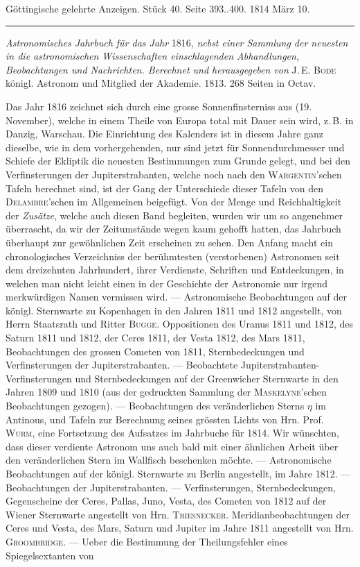 \clearpage
{}
\hypertarget{native-568-lower}{}
\begin{center}\small Göttingische gelehrte Anzeigen. Stück 40. Seite 393..400. 1814 März 10.\\[3pt]\rule{.72\linewidth}{.3pt}\end{center}

\emph{Astronomisches Jahrbuch für das Jahr} 1816, \emph{nebst einer Sammlung der neuesten in die astronomischen Wissenschaften einschlagenden Abhandlungen, Beobachtungen und Nachrichten. Berechnet und herausgegeben von} J.\,E. \textsc{Bode} königl. Astronom und Mitglied der Akademie. 1813. 268 Seiten in Octav.

Das Jahr 1816 zeichnet sich durch eine grosse Sonnenfinsterniss aus (19. November), welche in einem Theile von Europa total mit Dauer sein wird, z.\,B. in Danzig, Warschau. Die Einrichtung des Kalenders ist in diesem Jahre ganz dieselbe, wie in dem vorhergehenden, nur sind jetzt für Sonnendurchmesser und Schiefe der Ekliptik die neuesten Bestimmungen zum Grunde gelegt, und bei den Verfinsterungen der Jupiterstrabanten, welche noch nach den \textsc{Wargentin}'schen Tafeln berechnet sind, ist der Gang der Unterschiede dieser Tafeln von den \textsc{Delambre}'schen im Allgemeinen beigefügt. Von der Menge und Reichhaltigkeit der \emph{Zusätze}, welche auch diesen Band begleiten, wurden wir um so angenehmer überrascht, da wir der Zeitumstände wegen kaum gehofft hatten, das Jahrbuch überhaupt zur gewöhnlichen Zeit erscheinen zu sehen. Den Anfang macht ein chronologisches Verzeichniss der berühmtesten (verstorbenen) Astronomen seit dem dreizehnten Jahrhundert, ihrer Verdienste, Schriften und Entdeckungen, in welchen man nicht leicht einen in der Geschichte der Astronomie nur irgend merkwürdigen Namen vermissen wird. — Astronomische Beobachtungen auf der königl. Sternwarte zu Kopenhagen in den Jahren 1811 und 1812 angestellt, von Herrn Staatsrath und Ritter \textsc{Bugge}. Oppositionen des Uranus 1811 und 1812, des Saturn 1811 und 1812, der Ceres 1811, der Vesta 1812, des Mars 1811, Beobachtungen des grossen Cometen von 1811, Sternbedeckungen und Verfinsterungen der Jupiterstrabanten. — Beobachtete Jupiterstrabanten-Verfinsterungen und Sternbedeckungen auf der Greenwicher Sternwarte in den Jahren 1809 und 1810 (aus der gedruckten Sammlung der \textsc{Maskelyne}'schen Beobachtungen gezogen). — Beobachtungen des veränderlichen Sterns $\eta$ im Antinous, und Tafeln zur Berechnung seines grössten Lichts von Hrn. Prof. \textsc{Wurm}, eine Fortsetzung des Aufsatzes im Jahrbuche für 1814. Wir wünschten, dass dieser verdiente Astronom uns auch bald mit einer ähnlichen Arbeit über den veränderlichen Stern im Wallfisch beschenken möchte. — Astronomische Beobachtungen auf der königl. Sternwarte zu Berlin angestellt, im Jahre 1812. — Beobachtungen der Jupiterstrabanten. — Verfinsterungen, Sternbedeckungen, Gegenscheine der Ceres, Pallas, Juno, Vesta, des Cometen von 1812 auf der Wiener Sternwarte angestellt von Hrn. \textsc{Triesnecker}. Meridianbeobachtungen der Ceres und Vesta, des Mars, Saturn und Jupiter im Jahre 1811 angestellt von Hrn. \textsc{Groombridge}. — Ueber die Bestimmung der Theilungsfehler eines Spiegelsextanten von 